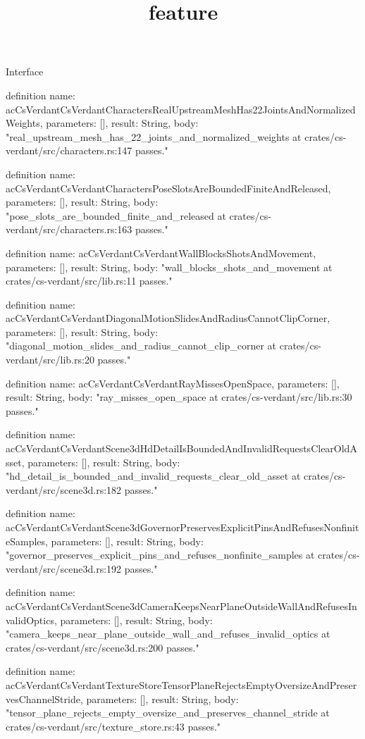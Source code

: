\begin{lexlean}{Interface}
\title{feature}
\begin{semanticmodule}
definition{
  name: acCsVerdantCsVerdantCharactersRealUpstreamMeshHas22JointsAndNormalizedWeights,
  parameters: [],
  result: String,
  body: "real_upstream_mesh_has_22_joints_and_normalized_weights at crates/cs-verdant/src/characters.rs:147 passes."
}

definition{
  name: acCsVerdantCsVerdantCharactersPoseSlotsAreBoundedFiniteAndReleased,
  parameters: [],
  result: String,
  body: "pose_slots_are_bounded_finite_and_released at crates/cs-verdant/src/characters.rs:163 passes."
}

definition{
  name: acCsVerdantCsVerdantWallBlocksShotsAndMovement,
  parameters: [],
  result: String,
  body: "wall_blocks_shots_and_movement at crates/cs-verdant/src/lib.rs:11 passes."
}

definition{
  name: acCsVerdantCsVerdantDiagonalMotionSlidesAndRadiusCannotClipCorner,
  parameters: [],
  result: String,
  body: "diagonal_motion_slides_and_radius_cannot_clip_corner at crates/cs-verdant/src/lib.rs:20 passes."
}

definition{
  name: acCsVerdantCsVerdantRayMissesOpenSpace,
  parameters: [],
  result: String,
  body: "ray_misses_open_space at crates/cs-verdant/src/lib.rs:30 passes."
}

definition{
  name: acCsVerdantCsVerdantScene3dHdDetailIsBoundedAndInvalidRequestsClearOldAsset,
  parameters: [],
  result: String,
  body: "hd_detail_is_bounded_and_invalid_requests_clear_old_asset at crates/cs-verdant/src/scene3d.rs:182 passes."
}

definition{
  name: acCsVerdantCsVerdantScene3dGovernorPreservesExplicitPinsAndRefusesNonfiniteSamples,
  parameters: [],
  result: String,
  body: "governor_preserves_explicit_pins_and_refuses_nonfinite_samples at crates/cs-verdant/src/scene3d.rs:192 passes."
}

definition{
  name: acCsVerdantCsVerdantScene3dCameraKeepsNearPlaneOutsideWallAndRefusesInvalidOptics,
  parameters: [],
  result: String,
  body: "camera_keeps_near_plane_outside_wall_and_refuses_invalid_optics at crates/cs-verdant/src/scene3d.rs:200 passes."
}

definition{
  name: acCsVerdantCsVerdantTextureStoreTensorPlaneRejectsEmptyOversizeAndPreservesChannelStride,
  parameters: [],
  result: String,
  body: "tensor_plane_rejects_empty_oversize_and_preserves_channel_stride at crates/cs-verdant/src/texture_store.rs:43 passes."
}


\end{semanticmodule}
\end{lexlean}
